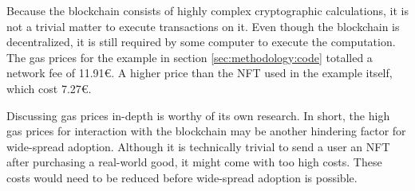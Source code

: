 Because the blockchain consists of highly complex cryptographic calculations, it is not a trivial matter to execute transactions on it. Even though the blockchain is decentralized, it is still required by some computer to execute the computation. The gas prices for the example in section \ref{sec:methodology:code} totalled a network fee of 11.91€. A higher price than the NFT used in the example itself, which cost 7.27€.

Discussing gas prices in-depth is worthy of its own research. In short, the high gas prices for interaction with the blockchain may be another hindering factor for wide-spread adoption. Although it is technically trivial to send a user an NFT after purchasing a real-world good, it might come with too high costs. These costs would need to be reduced before wide-spread adoption is possible.

